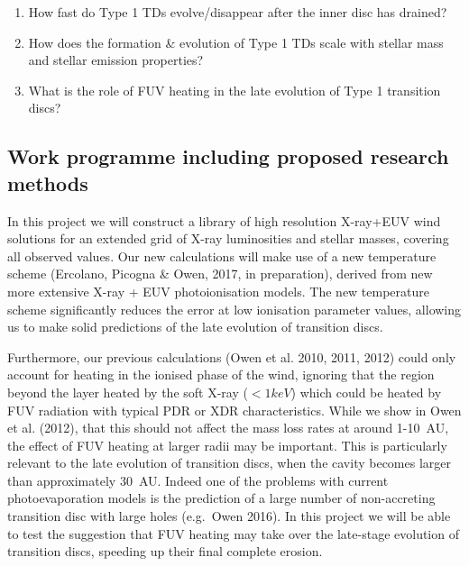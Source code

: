 \documentclass[10pt,fleqn,twoside]{article}
\begin{document}
\begin{enumerate}
\item How fast do Type 1 TDs evolve/disappear after the inner disc has
  drained?
\item How does the formation \& evolution of Type 1 TDs scale with
  stellar mass and stellar emission properties?
\item What is the role of FUV heating in the late evolution of Type 1
  transition discs? 
\end{enumerate}



\subsection{Work programme including proposed research methods}
In this project we will construct a
library of high resolution X-ray+EUV wind solutions for an extended grid of
X-ray luminosities and stellar masses, covering all observed
values. Our new calculations will make use of a new temperature
scheme (Ercolano, Picogna \& Owen, 2017, in preparation), derived from
new more extensive X-ray + EUV photoionisation models.  The new
temperature scheme
significantly reduces the error at low ionisation parameter values,
allowing us to make solid predictions of the late evolution of
transition discs. 

Furthermore, our previous calculations (Owen et al. 2010, 2011, 2012)
could only account for heating 
in the ionised phase of the wind, ignoring that the region beyond the
layer heated by the soft X-ray ($<1keV$) which could be heated by FUV
radiation with typical PDR or XDR characteristics. While we show in
Owen et al. (2012), that this should not affect the mass loss rates at
around 1-10~AU, the effect of FUV heating at larger radii may be
important. This is particularly relevant to the late evolution of
transition discs, when the cavity becomes larger than approximately
30~AU. Indeed one of the
problems with current photoevaporation models is the prediction of a
large number of non-accreting transition disc with large holes
(e.g.\ Owen 2016). In this project we will be able to test the
suggestion that FUV heating may take over the late-stage evolution of
transition discs, speeding up their final complete erosion. 
\end{document}
